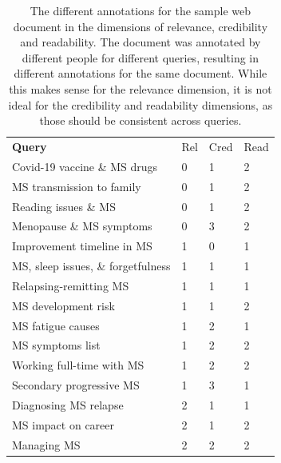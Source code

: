 \begin{table}
        \centering
        \begin{tabularx}{\linewidth}{lXXX}
        \textbf{Query}                                                         & Rel & Cred & Read \\
        Covid-19 vaccine \& MS drugs                                            & 0            & 1             & 2             \\
        MS transmission to family                                              & 0            & 1             & 2             \\
        Reading issues \& MS                                                    & 0            & 1             & 2             \\
        Menopause \& MS symptoms                                                & 0            & 3             & 2             \\
        Improvement timeline in MS                                             & 1            & 0             & 1             \\
        MS, sleep issues, \& forgetfulness                                      & 1            & 1             & 1             \\
        Relapsing-remitting MS                                                 & 1            & 1             & 1             \\
        MS development risk                                                    & 1            & 1             & 2             \\
        MS fatigue causes                                                      & 1            & 2             & 1             \\
        MS symptoms list                                                       & 1            & 2             & 2             \\
        Working full-time with MS                                              & 1            & 2             & 2             \\
        Secondary progressive MS                                               & 1            & 3             & 1             \\
        Diagnosing MS relapse                                                  & 2            & 1             & 1             \\
        MS impact on career                                                    & 2            & 1             & 2             \\
        Managing MS                                                            & 2            & 2             & 2            
        \end{tabularx}
        \caption{The different annotations for the sample web document in the dimensions of relevance, credibility and readability.
        The document was annotated by different people for different queries, resulting in different annotations for the same document.
        While this makes sense for the relevance dimension, it is not ideal for the credibility and readability dimensions, as those should be consistent across queries.}
\end{table}
